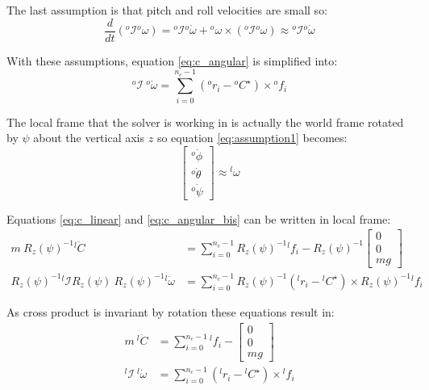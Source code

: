\documentclass[a4paper,11pt]{article}
\begin{document}
The last assumption is that pitch and roll velocities are small so:
\begin{equation}
	\frac{d}{dt}({}^o\!\mathcal{I} {}^o\!\omega) = {}^o\!\mathcal{I} {}^o\! \dot \omega + {}^o\! \omega \times ({}^o\!\mathcal{I} {}^o\! \omega) \approx {}^o\!\mathcal{I} {}^o\! \dot \omega
\end{equation}

With these assumptions, equation \ref{eq:c_angular} is simplified into:
\begin{equation}
{}^o\!\mathcal{I} ~ {}^o\! \dot \omega = \sum_{i=0}^{n_c - 1} ({}^o\!r_i - {}^o\!C^\star) \times {}^o\!f_i \label{eq:c_angular_bis}
\end{equation}

The local frame that the solver is working in is actually the world frame rotated by $\psi$ about the vertical axis $z$ so equation \ref{eq:assumption1} becomes:
\begin{equation}
\begin{bmatrix} {}^o\! \dot \phi \\ {}^o\! \dot \theta \\ {}^o\! \dot \psi \end{bmatrix} \approx {}^l\!\omega \label{eq:approx_angular_velocity}
\end{equation}

Equations \ref{eq:c_linear} and \ref{eq:c_angular_bis} can be written in local frame:
\begin{align}
m ~ R_z(\psi)^{-1} {}^l\!  \ddot C &= \sum_{i=0}^{n_c - 1} R_z(\psi)^{-1} {}^l\!f_i - R_z(\psi)^{-1} \begin{bmatrix} 0 \\ 0 \\ mg \end{bmatrix} \\
R_z(\psi)^{-1} {}^l\!\mathcal{I} R_z(\psi) ~ R_z(\psi)^{-1} {}^l\! \dot \omega &= \sum_{i=0}^{n_c - 1} R_z(\psi)^{-1} ({}^l\!r_i - {}^l\!C^\star) \times R_z(\psi)^{-1} {}^l\!f_i
\end{align}

As cross product is invariant by rotation these equations result in:
\begin{align}
m ~ {}^l\!  \ddot C &= \sum_{i=0}^{n_c - 1} {}^l\!f_i - \begin{bmatrix} 0 \\ 0 \\ mg \end{bmatrix} \\
{}^l\!\mathcal{I} ~ {}^l\! \dot \omega &= \sum_{i=0}^{n_c - 1} ({}^l\!r_i - {}^l\!C^\star) \times {}^l\!f_i
\end{align}
\end{document}
